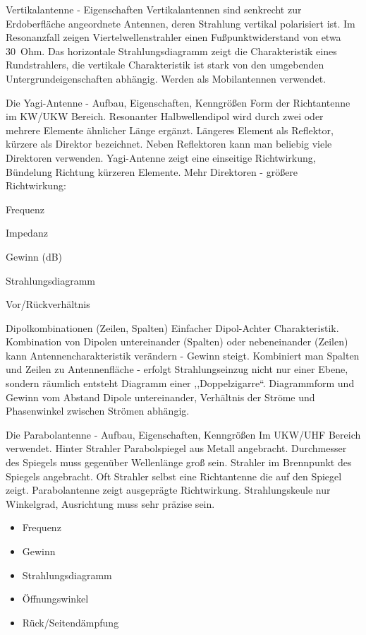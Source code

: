 \documentclass[avery5371,grid,frame,a4paper]{flashcards}
\newcommand{\card}[3]{
  \begin{flashcard}[{\chap} -- #1]{#2}#3\end{flashcard}
}
\begin{document}
\card{33}{Vertikalantenne - Eigenschaften}{
  Vertikalantennen sind senkrecht zur Erdoberfläche angeordnete Antennen, deren Strahlung vertikal polarisiert ist. Im Resonanzfall zeigen Viertelwellenstrahler einen Fußpunktwiderstand von etwa 30~Ohm. Das horizontale Strahlungsdiagramm zeigt die Charakteristik eines Rundstrahlers, die vertikale Charakteristik ist stark von den umgebenden Untergrundeigenschaften abhängig. Werden als Mobilantennen verwendet.}
\card{34}{Die Yagi-Antenne - Aufbau, Eigenschaften, Kenngrößen}{
  Form der Richtantenne im KW/UKW Bereich.
  Resonanter Halbwellendipol wird durch zwei oder mehrere Elemente ähnlicher Länge ergänzt. Längeres Element als Reflektor, kürzere als Direktor bezeichnet. Neben Reflektoren kann man beliebig viele Direktoren verwenden. Yagi-Antenne zeigt eine einseitige Richtwirkung, Bündelung Richtung kürzeren Elemente. Mehr Direktoren - größere Richtwirkung:

  \begin{itemize*}
    \item Frequenz 
    \item Impedanz 
    \item Gewinn (dB) 
    \item Strahlungsdiagramm 
    \item Vor/Rückverhältnis
  \end{itemize*}
}
\card{35}{Dipolkombinationen (Zeilen, Spalten)}{
  Einfacher Dipol-Achter Charakteristik. Kombination von Dipolen untereinander (Spalten) oder nebeneinander (Zeilen) kann Antennencharakteristik verändern - Gewinn steigt. Kombiniert man Spalten und Zeilen zu Antennenfläche - erfolgt Strahlungseinzug nicht nur einer Ebene, sondern räumlich entsteht Diagramm einer ,,Doppelzigarre``. Diagrammform und Gewinn vom Abstand Dipole untereinander, Verhältnis der Ströme und Phasenwinkel zwischen Strömen abhängig.
}
\card{36}{Die Parabolantenne - Aufbau, Eigenschaften, Kenngrößen}{
  \small
  Im UKW/UHF Bereich verwendet.
  Hinter Strahler Parabolspiegel aus Metall angebracht. Durchmesser des Spiegels muss gegenüber Wellenlänge groß sein. Strahler im Brennpunkt des Spiegels angebracht. Oft Strahler selbst eine Richtantenne die auf den Spiegel zeigt. Parabolantenne zeigt ausgeprägte Richtwirkung. Strahlungskeule nur Winkelgrad, Ausrichtung muss sehr präzise sein.

  \vspace{5pt}
  \begin{minipage}{0.5\textwidth}
    \begin{itemize}
      \item Frequenz 
      \item Gewinn 
      \item Strahlungsdiagramm 
    \end{itemize}
  \end{minipage}
  \begin{minipage}{0.49\textwidth}
    \begin{itemize}
      \item Öffnungswinkel 
      \item {\footnotesize Rück/Seitendämpfung}
    \end{itemize}
  \end{minipage}
}
\end{document}
